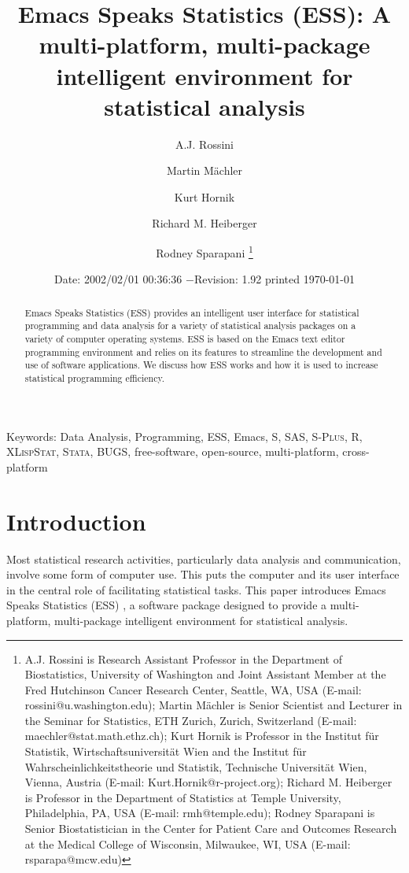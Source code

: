 \documentclass{article}
\title{Emacs Speaks Statistics (ESS): A multi-platform, multi-package
intelligent environment for statistical analysis}
\author{A.J. Rossini \and Martin M{\"a}chler \and Kurt Hornik \and Richard
  M. Heiberger \and Rodney Sparapani \footnote{%
    A.J. Rossini is Research Assistant Professor in the Department of
    Biostatistics, University of Washington and Joint Assistant Member at
    the Fred Hutchinson Cancer Research Center, Seattle, WA, USA
    (E-mail: rossini@u.washington.edu);
    Martin M{\"a}chler is Senior Scientist and Lecturer in the Seminar for
    Statistics, ETH Zurich, Zurich, Switzerland
    (E-mail: maechler@stat.math.ethz.ch);
    Kurt Hornik is Professor in the Institut f{\"u}r Statistik,
    Wirtschaftsuniversit{\"a}t Wien and the Institut f{\"u}r
    Wahrscheinlichkeitstheorie und Statistik, Technische Universit{\"a}t
    Wien, Vienna, Austria (E-mail: Kurt.Hornik@r-project.org);
    Richard M. Heiberger is Professor in the Department of Statistics at
    Temple University, Philadelphia, PA, USA (E-mail: rmh@temple.edu);
    Rodney Sparapani is Senior Biostatistician in the Center for Patient
    Care and Outcomes Research at the Medical College of Wisconsin, 
    Milwaukee, WI, USA (E-mail: rsparapa@mcw.edu)}}
\date{$ $Date: 2002/02/01 00:36:36 $ - $Revision: 1.92 $ $\tiny printed \today}
\newif\ifdraft
\renewcommand{\baselinestretch}{1.5}
\newcommand*{\SAS}{\textsc{SAS}}
\newcommand*{\Splus}{\textsc{S-Plus}}
\newcommand*{\XLispStat}{\textsc{XLispStat}}
\newcommand*{\Stata}{\textsc{Stata}}
\begin{document}

\ifdraft
\setcounter{page}{0}
\tableofcontents
\fi

\maketitle

\ifdraft{}%
\else%
 \renewcommand{\baselinestretch}{1.5}
\fi

\begin{abstract}
  Emacs Speaks Statistics (ESS) provides an intelligent user
  interface for statistical programming and data analysis 
  for a variety of statistical analysis packages on a
  variety of computer operating systems.  ESS is based on the Emacs
  text editor programming environment and relies 
  on its features to streamline the development and use of
  software applications.  We discuss how ESS works and how
  it is used to increase statistical programming efficiency.
\end{abstract}

\noindent Keywords: Data Analysis, Programming, ESS, Emacs, S, \SAS,
\Splus, R, \XLispStat, \Stata, BUGS, free-software, open-source,
multi-platform, cross-platform


\section{Introduction}
\label{sec:introduction}

Most statistical research activities, particularly data analysis and
communication, involve some form of computer use.
This puts the computer and its user interface
in the central role of facilitating statistical tasks.
This paper introduces Emacs Speaks Statistics (ESS)
\citep{ESS}, a software package designed to provide a 
multi-platform, multi-package intelligent environment for statistical analysis.
\end{document}

